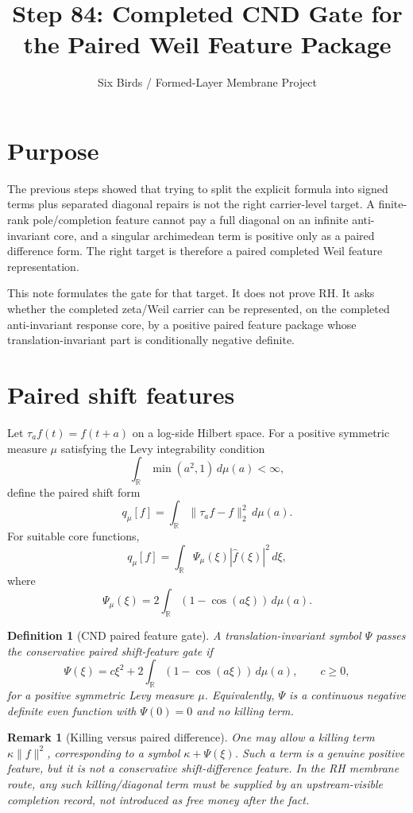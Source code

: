 \documentclass[11pt]{article}
\title{Step 84: Completed CND Gate for the Paired Weil Feature Package}
\author{Six Birds / Formed-Layer Membrane Project}
\date{}
\newtheorem{definition}{Definition}
\newtheorem{remark}{Remark}
\begin{document}
\maketitle

\section{Purpose}
The previous steps showed that trying to split the explicit formula into signed terms plus separated diagonal repairs is not the right carrier-level target.  A finite-rank pole/completion feature cannot pay a full diagonal on an infinite anti-invariant core, and a singular archimedean term is positive only as a paired difference form.  The right target is therefore a paired completed Weil feature representation.

This note formulates the gate for that target.  It does not prove RH.  It asks whether the completed zeta/Weil carrier can be represented, on the completed anti-invariant response core, by a positive paired feature package whose translation-invariant part is conditionally negative definite.

\section{Paired shift features}
Let \(\tau_a f(t)=f(t+a)\) on a log-side Hilbert space.  For a positive symmetric measure \(\mu\) satisfying the Levy integrability condition
\[
  \int_{\mathbb R}\min(a^2,1)\,d\mu(a)<\infty,
\]
define the paired shift form
\[
  q_\mu[f]=\int_{\mathbb R}\|\tau_a f-f\|_2^2\,d\mu(a).
\]
For suitable core functions,
\[
  q_\mu[f]=\int_{\mathbb R}\Psi_\mu(\xi)|\widehat f(\xi)|^2\,d\xi,
\]
where
\[
  \Psi_\mu(\xi)=2\int_{\mathbb R}(1-\cos(a\xi))\,d\mu(a).
\]

\begin{definition}[CND paired feature gate]
A translation-invariant symbol \(\Psi\) passes the conservative paired shift-feature gate if
\[
  \Psi(\xi)=c\xi^2+2\int_{\mathbb R}(1-\cos(a\xi))\,d\mu(a),
  \qquad c\ge0,
\]
for a positive symmetric Levy measure \(\mu\).  Equivalently, \(\Psi\) is a continuous negative definite even function with \(\Psi(0)=0\) and no killing term.
\end{definition}

\begin{remark}[Killing versus paired difference]
One may allow a killing term \(\kappa\|f\|^2\), corresponding to a symbol \(\kappa+\Psi(\xi)\).  Such a term is a genuine positive feature, but it is not a conservative shift-difference feature.  In the RH membrane route, any such killing/diagonal term must be supplied by an upstream-visible completion record, not introduced as free money after the fact.
\end{remark}
\end{document}
